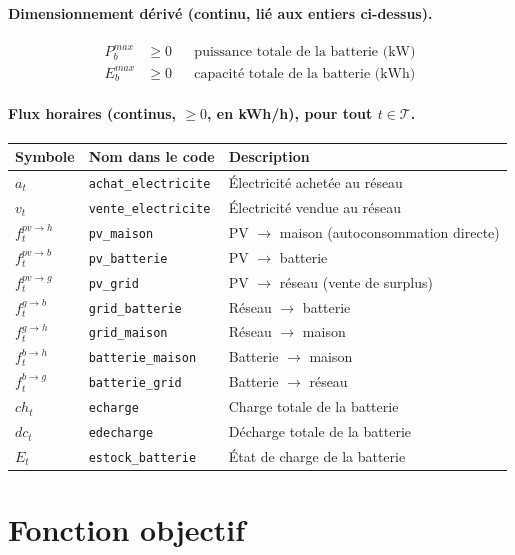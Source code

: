 \documentclass[11pt]{article}
\begin{document}
\paragraph{Dimensionnement dérivé (continu, lié aux entiers ci-dessus).}
\begin{align*}
P^{max}_{b} &\geq 0 && \text{puissance totale de la batterie (kW)} \\
E^{max}_{b} &\geq 0 && \text{capacité totale de la batterie (kWh)}
\end{align*}

\paragraph{Flux horaires (continus, $\geq 0$, en kWh/h), pour tout $t \in \mathcal{T}$.}

\begin{center}
\begin{tabular}{@{}lll@{}}
\toprule
Symbole & Nom dans le code & Description \\
\midrule
$a_t$ & \texttt{achat\_electricite} & Électricité achetée au réseau \\
$v_t$ & \texttt{vente\_electricite} & Électricité vendue au réseau \\
$f^{pv \to h}_t$ & \texttt{pv\_maison} & PV $\to$ maison (autoconsommation directe) \\
$f^{pv \to b}_t$ & \texttt{pv\_batterie} & PV $\to$ batterie \\
$f^{pv \to g}_t$ & \texttt{pv\_grid} & PV $\to$ réseau (vente de surplus) \\
$f^{g \to b}_t$ & \texttt{grid\_batterie} & Réseau $\to$ batterie \\
$f^{g \to h}_t$ & \texttt{grid\_maison} & Réseau $\to$ maison \\
$f^{b \to h}_t$ & \texttt{batterie\_maison} & Batterie $\to$ maison \\
$f^{b \to g}_t$ & \texttt{batterie\_grid} & Batterie $\to$ réseau \\
$ch_t$ & \texttt{echarge} & Charge totale de la batterie \\
$dc_t$ & \texttt{edecharge} & Décharge totale de la batterie \\
$E_t$ & \texttt{estock\_batterie} & État de charge de la batterie \\
\bottomrule
\end{tabular}
\end{center}

\section{Fonction objectif}
\end{document}
